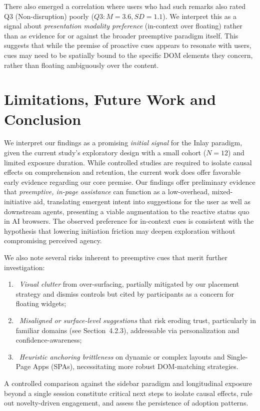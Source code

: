 \documentclass[sigconf]{acmart}
\begin{document}
There also emerged a correlation where users who had such remarks also rated Q3 (Non-disruption) poorly ($Q3: M=3.6, SD=1.1$). We interpret this as a signal about \emph{presentation modality preference} (in-context over floating) rather than as evidence for or against the broader preemptive paradigm itself. This suggests that while the premise of proactive cues appears to resonate with users, cues may need to be spatially bound to the specific DOM elements they concern, rather than floating ambiguously over the content.


\section{Limitations, Future Work and Conclusion}
We interpret our findings as a promising \textit{initial signal} for the Inlay paradigm, given the current study's exploratory design with a small cohort ($N=12$) and limited exposure duration. While controlled studies are required to isolate causal effects on comprehension and retention, the current work does offer favorable early evidence regarding our core premise. Our findings offer preliminary evidence that \textit{preemptive, in-page assistance} can function as a low-overhead, mixed-initiative aid, translating emergent intent into suggestions for the user as well as downstream agents, presenting a viable augmentation to the reactive status quo in AI browsers. The observed preference for in-context cues is consistent with the hypothesis that lowering initiation friction may deepen exploration without compromising perceived agency.

\newpage

We also note several risks inherent to preemptive cues that merit further investigation:

\begin{enumerate}

    \item ~\emph{Visual clutter} from over-surfacing, partially mitigated by our placement strategy and dismiss controls but cited by participants as a concern for floating widgets; 
    \item ~\emph{Misaligned or surface-level suggestions} that risk eroding trust, particularly in familiar domains (see Section~4.2.3), addressable via personalization and confidence-awareness; 
    \item ~\emph{Heuristic anchoring brittleness} on dynamic or complex layouts and Single-Page Apps (SPAs), necessitating more robust DOM-matching strategies. 
\end{enumerate}
A controlled comparison against the sidebar paradigm and longitudinal exposure beyond a single session constitute critical next steps to isolate causal effects, rule out novelty-driven engagement, and assess the persistence of adoption patterns.\\
\end{document}
